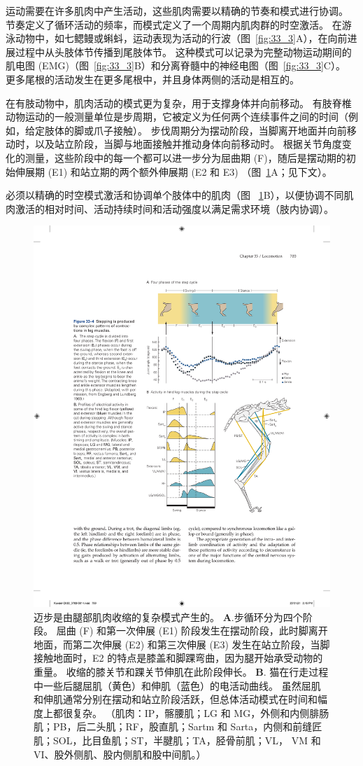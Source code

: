 运动需要在许多肌肉中产生活动，这些肌肉需要以精确的节奏和模式进行协调。
节奏定义了循环活动的频率，而模式定义了一个周期内肌肉群的时空激活。
在游泳动物中，如七鳃鳗或蝌蚪，运动表现为活动的行波（图~\ref{fig:33_3}A），在向前进展过程中从头肢体节传播到尾肢体节。
这种模式可以记录为完整动物运动期间的肌电图 (EMG)（图~\ref{fig:33_3}B）和分离脊髓中的神经电图（图~\ref{fig:33_3}C）。
更多尾根的活动发生在更多尾根中，并且身体两侧的活动是相互的。


在有肢动物中，肌肉活动的模式更为复杂，用于支撑身体并向前移动。
有肢脊椎动物运动的一般测量单位是步周期，它被定义为任何两个连续事件之间的时间（例如，给定肢体的脚或爪子接触）。
步伐周期分为摆动阶段，当脚离开地面并向前移动时，以及站立阶段，当脚与地面接触并推动身体向前移动时。
根据关节角度变化的测量，这些阶段中的每一个都可以进一步分为屈曲期 (F)，随后是摆动期的初始伸展期 (E1) 和站立期的两个额外伸展期 (E2 和 E3) （图~\ref{fig:33_4}A；见下文）。


必须以精确的时空模式激活和协调单个肢体中的肌肉（图 ~\ref{fig:33_4}B），以便协调不同肌肉激活的相对时间、活动持续时间和活动强度以满足需求环境（肢内协调）。


\begin{figure}[htbp]
	\centering
	\includegraphics[width=0.65\linewidth]{chap33/fig_33_4}
	\caption{迈步是由腿部肌肉收缩的复杂模式产生的。
	\textbf{A}.步循环分为四个阶段。
	屈曲 (F) 和第一次伸展 (E1) 阶段发生在摆动阶段，此时脚离开地面，而第二次伸展 (E2) 和第三次伸展 (E3) 发生在站立阶段，当脚接触地面时，E2 的特点是膝盖和脚踝弯曲，因为腿开始承受动物的重量。
	收缩的膝关节和踝关节伸肌在此阶段伸长\cite{engberg1969electromyographic}。
	\textbf{B}. 猫在行走过程中一些后腿屈肌（黄色）和伸肌（蓝色）的电活动曲线。
	虽然屈肌和伸肌通常分别在摆动和站立阶段活跃，但总体活动模式在时间和幅度上都很复杂。 （肌肉：IP，髂腰肌；LG 和 MG，外侧和内侧腓肠肌；PB，后二头肌；RF，股直肌；Sartm 和 Sarta，内侧和前缝匠肌；SOL，比目鱼肌；ST，半腱肌；TA，胫骨前肌；VL， VM 和 VI、股外侧肌、股内侧肌和股中间肌。）}
	\label{fig:33_4}
\end{figure}



